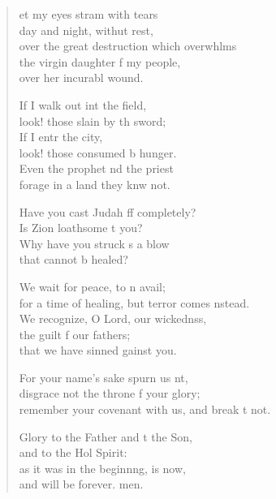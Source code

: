 \settowidth{\versewidth}{remember your covenant with us, and break it not.}
\begin{verse}%
  \begin{patverse}
et my eyes stram with tears\Med\\
day and night, withut rest,\\
over the great destruction which overwhlms\Flex\\
the virgin daughter f my people,\Med\\
over her incurabl wound.

If I walk out int the field,\Med\\
look! those slain by th sword;\\
If I entr the city,\Med\\
look! those consumed b hunger.\\
Even the prophet nd the priest\Med\\
forage in a land they knw not.

Have you cast Judah ff completely?\Med\\
Is Zion loathsome t you?\\
Why have you struck s a blow\Med\\
that cannot b healed?

We wait for peace, to n avail;\Med\\
for a time of healing, but terror comes \pointup{\i}nstead.\\
We recognize, O Lord, our wickednss,\Flex\\
the guilt f our fathers;\Med\\
that we have sinned gainst you.

For your name’s sake spurn us nt,\Flex\\
disgrace not the throne f your glory;\Med\\
remember your covenant with us, and break \pointup{\i}t not.

Glory to the Father and t the Son,\Med\\
and to the Hol Spirit:\\
as it was in the beginnng, is now,\Med\\
and will be forever. men.
  \end{patverse}
\end{verse}
